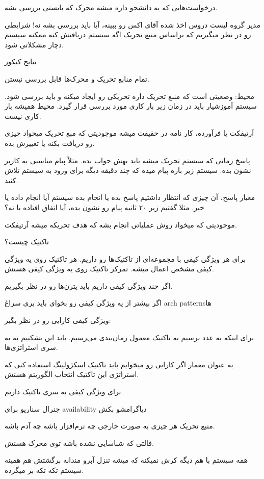درخواست‌هایی که یه دانشجو داره میشه محرک که بایستی بررسی بشه.

مدیر گروه لیست دروس اخذ شده آقای اکس رو ببینه، آیا باید بررسی بشه نه! شرایطی رو
در نظر میگیریم که براساس منبع تحریک اگه سیستم دریافتش کنه ممکنه سیستم دچار
مشکلاتی شود.

نتایج کنکور

تمام منابع تحریک و محرک‌ها قابل بررسی نیستن.

محیط: وضعیتی است که منبع تحریک داره تحریکی رو ایجاد میکنه و باید بررسی شود.
سیستم آموزشیار باید در زمان زیر بار کاری مورد بررسی قرار گیرد. محیط همیشه بار
کاری نیست. 

آرتیفکت یا فرآورده، کار نامه در حقیقت میشه موجودیتی که مبع تحریک میخواد چیزی رو
دریافت بکنه یا تغییرش بده. 

پاسخ زمانی که سیستم تحریک میشه باید بهش جواب بده. مثلاً پیام مناسبی به کاربر
نشون بده. سیستم زیر باره پیام میده که چند دقیقه دیگه برای ورود به سیستم تلاش
کنید.

معیار پاسخ، آن چیزی که انتظار داشتیم پاسخ بده یا انجام بده سیستم آیا انجام داده
یا خیر. مثلا گفتیم زیر ۲۰ ثانیه پیام رو نشون بده، آیا اتفاق افتاده یا نه؟

موجودیتی که میخواد روش عملیاتی انجام بشه که هدف تحریکه میشه آرتیفکت.

تاکتیک چیست؟

برای هر ویژگی کیفی با مجموعه‌ای از تاکتیک‌ها رو داریم. هر تاکتیک روی یه ویژگی
کیفی مشخص اعمال میشه. تمرکز تاکتیک روی یه ویژگی کیفی هستش.

اگر چند ویژگی کیفی داریم باید پترن‌ها رو در نظر بگیریم.

اگر بیشتر از یه ویژگی کیفی رو بخوای باید بری سراغ arch patternsها

ویزگی کیفی کارایی رو در نظر بگیر:

برای اینکه به عدد برسیم به تاکتیک معمول زمان‌بندی می‌رسیم. باید این بشکنیم به یه
سری استراتژی‌ها.

به عنوان معمار اگر کارایی رو میخوایم باید تاکتیک اسکژولینگ استفاده کنی که
استراتژی این تاکتیک انتخاب الگوریتم هستش.

برای ویژگی کیفی یه سری تاکتیک داریم.

جنرال سناریو برای availability دیاگرامشو بکش

منبع تحریک هر چیزی به صورت خارجی چه نرم‌افزار باشه چه آدم باشه.

فالتی که شناسایی نشده باشه توی محرک هستش.

همه سیستم با هم دیگه کرش نمیکنه که میشه تنزل آبرو مندانه برگشتش هم همینه سیستم
تکه تکه بر میگرده.

